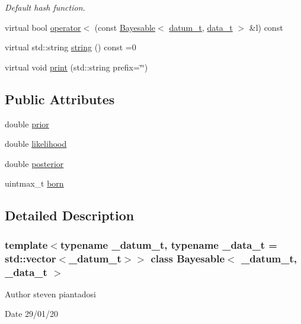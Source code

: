 \begin{DoxyCompactItemize}
\begin{DoxyCompactList}\small\item\em Default hash function. \end{DoxyCompactList}\item 
virtual bool \hyperlink{class_bayesable_ac356e7e5b11c266b8442064186dbe89d}{operator$<$} (const \hyperlink{class_bayesable}{Bayesable}$<$ \hyperlink{class_bayesable_a9f1a6c0cd7855550fa10b1a8f13a5867}{datum\+\_\+t}, \hyperlink{class_bayesable_aa2788c4d7718c0a824e1d28c4c98f921}{data\+\_\+t} $>$ \&l) const
\item 
virtual std\+::string \hyperlink{class_bayesable_afcea9b439bcf321d5354710d8861cb54}{string} () const =0
\item 
virtual void \hyperlink{class_bayesable_a87d5d9481d6a72b017e44b175071fa5e}{print} (std\+::string prefix=\char`\"{}\char`\"{})
\end{DoxyCompactItemize}
\subsection*{Public Attributes}
\begin{DoxyCompactItemize}
\item 
double \hyperlink{class_bayesable_a473790922c2dd73e227350d029d73003}{prior}
\item 
double \hyperlink{class_bayesable_a4d1a9ed826013bf079cea1867b6d4183}{likelihood}
\item 
double \hyperlink{class_bayesable_a268442b9aae5b763c17ca29c39231915}{posterior}
\item 
uintmax\+\_\+t \hyperlink{class_bayesable_a898e03a20e1851c868b77ef4e844f0bf}{born}
\end{DoxyCompactItemize}


\subsection{Detailed Description}
\subsubsection*{template$<$typename \+\_\+datum\+\_\+t, typename \+\_\+data\+\_\+t = std\+::vector$<$\+\_\+datum\+\_\+t$>$$>$\newline
class Bayesable$<$ \+\_\+datum\+\_\+t, \+\_\+data\+\_\+t $>$}

\begin{DoxyAuthor}{Author}
steven piantadosi 
\end{DoxyAuthor}
\begin{DoxyDate}{Date}
29/01/20 
\end{DoxyDate}



